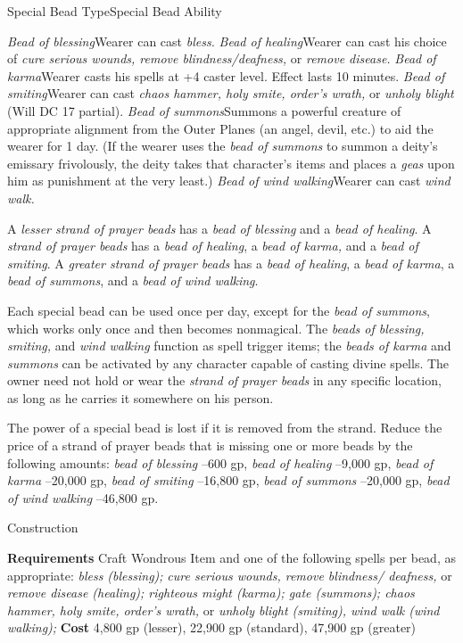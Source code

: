 Special Bead TypeSpecial Bead Ability

\textit{Bead of blessing}Wearer can cast \textit{bless.}
\textit{Bead of healing}Wearer can cast his choice of \textit{cure serious wounds, remove blindness/deafness, }or \textit{remove disease.}
\textit{Bead of karma}Wearer casts his spells at +4 caster level. Effect lasts 10 minutes.
\textit{Bead of smiting}Wearer can cast \textit{chaos hammer, holy smite, order's wrath, }or \textit{unholy blight }(Will DC 17 partial).
\textit{Bead of summons}Summons a powerful creature of appropriate alignment from the Outer Planes (an angel, devil, etc.) to aid the wearer for 1 day. (If the wearer uses the \textit{bead of summons }to summon a deity's emissary frivolously, the deity takes that character's items and places a \textit{geas }upon him as punishment at the very least.)
\textit{Bead of wind walking}Wearer can cast \textit{wind walk.}
				
A \textit{lesser strand of prayer beads} has a \textit{bead of blessing} and a \textit{bead of healing}. A \textit{strand of prayer beads} has a \textit{bead of healing}, a \textit{bead of karma,} and a \textit{bead of smiting}. A \textit{greater strand of prayer beads} has a \textit{bead of healing}, a \textit{bead of karma}, a \textit{bead of summons}, and a \textit{bead of wind walking}.
				
Each special bead can be used once per day, except for the \textit{bead of summons}, which works only once and then becomes nonmagical. The \textit{beads of blessing, smiting,} and \textit{wind walking} function as spell trigger items; the \textit{beads of karma} and \textit{summons }can be activated by any character capable of casting divine spells. The owner need not hold or wear the \textit{strand of prayer beads} in any specific location, as long as he carries it somewhere on his person.
				
The power of a special bead is lost if it is removed from the strand. Reduce the price of a strand of prayer beads that is missing one or more beads by the following amounts: \textit{bead of blessing} --600 gp, \textit{bead of healing} --9,000 gp, \textit{bead of karma} --20,000 gp, \textit{bead of smiting} --16,800 gp, \textit{bead of summons} --20,000 gp, \textit{bead of wind walking }--46,800 gp. 
				
Construction
				
\textbf{Requirements} Craft Wondrous Item and one of the following spells per bead, as appropriate:\textit{ bless (blessing);} \textit{cure serious wounds, remove blindness/ deafness, }or\textit{ remove disease (healing); righteous might (karma); gate (summons); chaos hammer, holy smite, order's wrath,} or\textit{ unholy blight (smiting), wind walk (wind walking);}\textbf{ Cost }4,800 gp (lesser), 22,900 gp (standard), 47,900 gp (greater)
				
